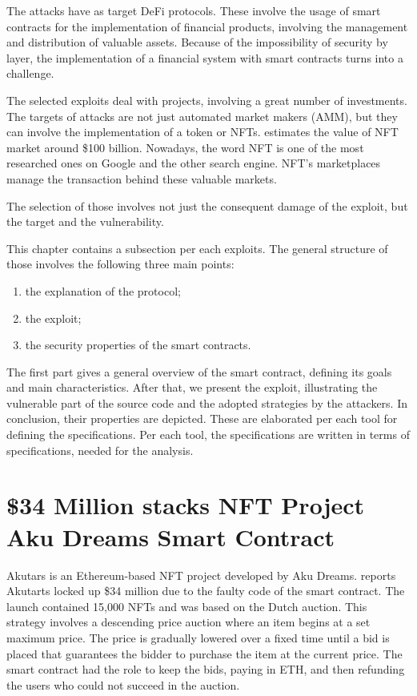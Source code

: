 The attacks have as target DeFi protocols. 
These involve the usage of smart contracts for the implementation of financial products, involving the management and distribution of valuable assets.
Because of the impossibility of security by layer, the implementation of a financial system with smart contracts turns into a challenge. 

The selected exploits deal with projects, involving a great number of investments. 
The targets of attacks are not just automated market makers (AMM), but they can involve the implementation of a token or NFTs.
\citet{NFTValue} estimates the value of NFT market around \$100 billion.
Nowadays, the word NFT is one of the most researched ones on Google and the other search engine.
NFT's marketplaces manage the transaction behind these valuable markets. 

The selection of those involves not just the consequent damage of the exploit, but the target and the vulnerability.

This chapter contains a subsection per each exploits. The general structure of those involves the following three main points:
\begin{enumerate}
    \item the explanation of the protocol;
    \item the exploit;
    \item the security properties of the smart contracts.
\end{enumerate}
The first part gives a general overview of the smart contract, 
defining its goals and main characteristics. 
After that, we present the exploit, illustrating the vulnerable part of the source code and the adopted strategies 
by the attackers.
In conclusion, their properties are depicted. 
These are elaborated per each tool for defining the specifications. 
Per each tool, the specifications are written in terms of specifications, needed for the analysis.

\section{\$34 Million stacks NFT Project Aku Dreams Smart Contract}
\label{sec:Exploits:AkuDreams}
Akutars is an Ethereum-based NFT project developed by Aku Dreams. 
\citet{Aku} reports Akutarts locked up \$34 million due to the faulty code of the smart contract.
The launch contained 15,000  NFTs and was based on the Dutch auction. 
This strategy involves a descending price auction where an item begins at a set maximum price. 
The price is gradually lowered over a fixed time until a bid is placed that guarantees the bidder to purchase the item at the current price. 
The smart contract had the role to keep the bids, paying in ETH, and then refunding the users who could not succeed in the auction.

